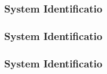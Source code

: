 \documentclass[fleqn]{beamer} %
\newcommand{\sectionIVsubsectionIVtitle}{System Identificatio}
\begin{document}
			\begin{frame}
				\frametitle{\sectionIVsubsectionIVtitle}
				\bigskip

			

		 		\btVFill 
			\end{frame}
			
			\begin{frame}
				\frametitle{\sectionIVsubsectionIVtitle}
				\bigskip
				
				
					
				\btVFill 
			\end{frame}

			\begin{frame}
				\frametitle{\sectionIVsubsectionIVtitle}
				\bigskip
			
				
				\btVFill 
			\end{frame}
\end{document}
